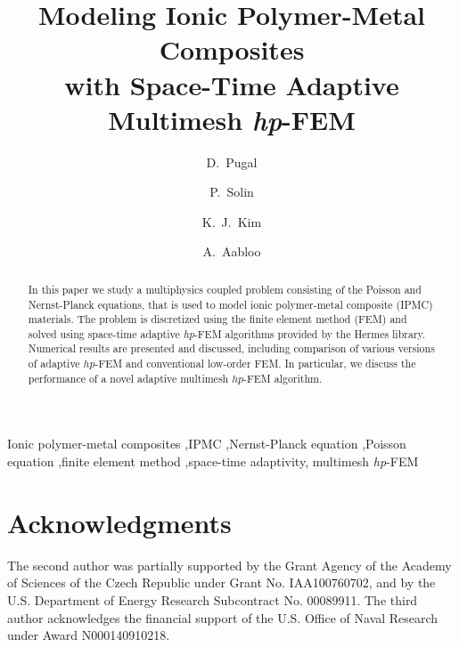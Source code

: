 \documentclass[letterpaper,3p]{elsarticle}
\begin{document}
\begin{frontmatter}

\title{Modeling Ionic Polymer-Metal Composites\\ with Space-Time Adaptive Multimesh \emph{hp}-FEM}

\author[unrme,tartu]{D.~Pugal}

\author[unrmath,czech]{P.~Solin}

\author[unrme]{K.~J.~Kim}

\author[tartu]{A.~Aabloo}

\address[unrme]{Mechanical Engineering Department, University of Nevada, Reno, NV, U.S.A.}
\address[unrmath]{Department of Mathematics and Statistics,
University of Nevada, Reno, NV, U.S.A.}
\address[czech]{Institute of Thermomechanics, Prague, Czech Republic}
\address[tartu]{Institute of Technology, Tartu University, Estonia}


\begin{abstract}
In this paper we study a multiphysics coupled problem consisting 
of the Poisson and Nernst-Planck equations, that is used to 
model ionic polymer-metal composite (IPMC) materials. 
The problem is discretized using the finite element method (FEM) and solved using 
space-time adaptive \emph{hp}-FEM algorithms provided by the Hermes 
library. Numerical results are presented and discussed, including 
comparison of various versions of adaptive $hp$-FEM and conventional 
low-order FEM. In particular, we discuss the performance of a novel
adaptive multimesh $hp$-FEM algorithm.
\end{abstract}

\begin{keyword}
  Ionic polymer-metal composites \sep IPMC \sep Nernst-Planck equation \sep Poisson equation 
  \sep finite element method \sep space-time adaptivity, multimesh \emph{hp}-FEM 
\end{keyword}

\end{frontmatter}







\section*{Acknowledgments}
The second author was partially supported by the Grant Agency of the Academy of 
Sciences of the Czech Republic under Grant No. IAA100760702, and by the U.S.
Department of Energy Research Subcontract No. 00089911. 
The third author acknowledges the financial support of the U.S. Office of Naval Research 
under Award N000140910218.


\end{document}
